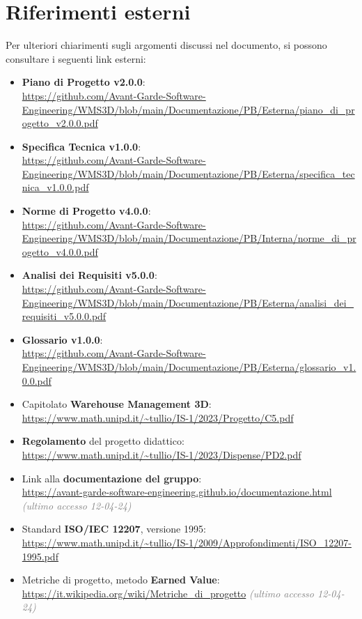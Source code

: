 \section{Riferimenti esterni} \label{sec:riferimenti_esterni}
Per ulteriori chiarimenti sugli argomenti discussi nel documento, si possono consultare i seguenti link esterni:
\begin{itemize}
    \item \textbf{Piano di Progetto v2.0.0}:\\
    \url{https://github.com/Avant-Garde-Software-Engineering/WMS3D/blob/main/Documentazione/PB/Esterna/piano_di_progetto_v2.0.0.pdf}
    \item \textbf{Specifica Tecnica v1.0.0}:\\
    \url{https://github.com/Avant-Garde-Software-Engineering/WMS3D/blob/main/Documentazione/PB/Esterna/specifica_tecnica_v1.0.0.pdf}
    \item \textbf{Norme di Progetto v4.0.0}:\\
    \url{https://github.com/Avant-Garde-Software-Engineering/WMS3D/blob/main/Documentazione/PB/Interna/norme_di_progetto_v4.0.0.pdf}
    \item \textbf{Analisi dei Requisiti v5.0.0}:\\
    \url{https://github.com/Avant-Garde-Software-Engineering/WMS3D/blob/main/Documentazione/PB/Esterna/analisi_dei_requisiti_v5.0.0.pdf}
    \item \textbf{Glossario v1.0.0}:\\
    \url{https://github.com/Avant-Garde-Software-Engineering/WMS3D/blob/main/Documentazione/PB/Esterna/glossario_v1.0.0.pdf}
    \item Capitolato \textbf{Warehouse Management 3D}:\\
    \url{https://www.math.unipd.it/~tullio/IS-1/2023/Progetto/C5.pdf}
    \item \textbf{Regolamento} del progetto didattico:\\
    \url{https://www.math.unipd.it/~tullio/IS-1/2023/Dispense/PD2.pdf}
    \item Link alla \textbf{documentazione del gruppo}:\\
    \url{https://avant-garde-software-engineering.github.io/documentazione.html} \textcolor{gray}{\textit{(ultimo accesso 12-04-24)}}
    \item Standard \textbf{ISO/IEC 12207}, versione 1995:\\
    \url{https://www.math.unipd.it/~tullio/IS-1/2009/Approfondimenti/ISO_12207-1995.pdf}
    \item Metriche di progetto, metodo \textbf{Earned Value}:\\
    \url{https://it.wikipedia.org/wiki/Metriche_di_progetto} \textcolor{gray}{\textit{(ultimo accesso 12-04-24)}}
\end{itemize}